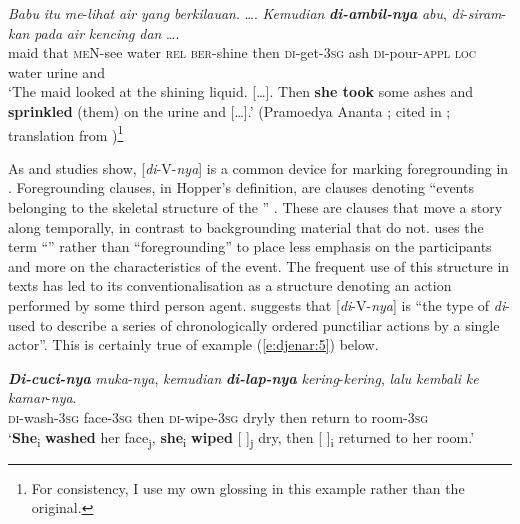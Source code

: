 \documentclass[output=paper
,modfonts
,nonflat]{langsci/langscibook}
\begin{document}
\begin{exe}
	\ex\label{e:djenar:4}
	\gll \textit{Babu}  \textit{itu}  \textit{me}-\textit{lihat}  \textit{air}  \textit{yang}  \textit{berkilauan}. {\ob}…{\cb}.  \textit{Kemudian} \textbf{\textit{di-ambil-nya}} \textit{abu},  \textit{di}-\textit{siram}-\textit{kan}  \textit{pada}     \textit{air}  \textit{kencing} \textit{dan} {\ob}…{\cb}.\\
	maid  that  \textsc{meN}-see  water  \textsc{rel}  \textsc{ber}-shine  {}  then \textsc{di}-get-\textsc{3sg}  ash  \textsc{di}-pour-\textsc{appl}  \textsc{loc}    water  urine and\\
	\glt ‘The maid looked at the shining liquid. […]. Then \textbf{she took} some ashes and \textbf{sprinkled} (them) on the urine and […].’ (Pramoedya Ananta \citealt[25--26]{Toer1963}; cited in \citealt[219]{Kaswanti1988}; translation from \citealt[219]{Kaswanti1988})\footnote{For consistency, I use my own glossing in this example rather than the original.} 
\end{exe}

\noindent
As  and  studies show, [\textit{di}-V-\textit{nya}] is a common device for marking foregrounding in . Foregrounding clauses, in Hopper’s definition, are clauses denoting “events belonging to the skeletal structure of the ” \citep[213]{Hopper1979}. These are clauses that move a story along temporally, in contrast to backgrounding material that do not. \citet[123]{Cumming1991} uses the term “” rather than “foregrounding” to place less emphasis on the participants and more on the characteristics of the event. The frequent use of this structure in  texts has led to its conventionalisation as a structure denoting an action performed by some third person agent. \citet[205]{Kaswanti1988} suggests that [\textit{di}-V-\textit{nya}] is “the type of \textit{di}- used to describe a series of chronologically ordered punctiliar actions by a single actor”. This is certainly true of example (\ref{e:djenar:5}) below. 

\begin{exe}
	\ex\label{e:djenar:5}
	\gll \textbf{\textit{Di-cuci-nya}} \textit{muka}-\textit{nya},   \textit{kemudian} \textbf{\textit{di-lap-nya}} \textit{kering}-\textit{kering},   \textit{lalu}   \textit{kembali}   \textit{ke}   \textit{kamar}-\textit{nya}.\\
	\textsc{di}-wash-3\textsc{sg}  face-\textsc{3sg}  then    \textsc{di}{}-wipe-3\textsc{sg}  dryly then  return    to  room-\textsc{3sg}\\
	\glt ‘\textbf{She}\textsubscript{i} \textbf{washed} her face\textsubscript{j}, \textbf{she}\textsubscript{i} \textbf{wiped} [ ]\textsubscript{j} dry, then [ ]\textsubscript{i} returned to her room.’\\ \hfill \citep[119]{Krisna1977}
\end{exe}
\end{document}
